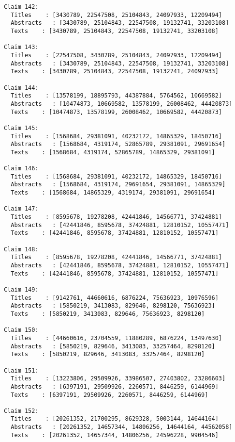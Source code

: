 \documentclass[11pt]{article}
\begin{document}
\begin{Verbatim}[commandchars=\\\{\}]
Claim 142:
  Titles    : [3430789, 22547508, 25104843, 24097933, 12209494]
  Abstracts   : [3430789, 25104843, 22547508, 19132741, 33203108]
  Texts    : [3430789, 25104843, 22547508, 19132741, 33203108]

Claim 143:
  Titles    : [22547508, 3430789, 25104843, 24097933, 12209494]
  Abstracts   : [3430789, 25104843, 22547508, 19132741, 33203108]
  Texts    : [3430789, 25104843, 22547508, 19132741, 24097933]

Claim 144:
  Titles    : [13578199, 18895793, 44387884, 5764562, 10669582]
  Abstracts   : [10474873, 10669582, 13578199, 26008462, 44420873]
  Texts    : [10474873, 13578199, 26008462, 10669582, 44420873]

Claim 145:
  Titles    : [1568684, 29381091, 40232172, 14865329, 18450716]
  Abstracts   : [1568684, 4319174, 52865789, 29381091, 29691654]
  Texts    : [1568684, 4319174, 52865789, 14865329, 29381091]

Claim 146:
  Titles    : [1568684, 29381091, 40232172, 14865329, 18450716]
  Abstracts   : [1568684, 4319174, 29691654, 29381091, 14865329]
  Texts    : [1568684, 14865329, 4319174, 29381091, 29691654]

Claim 147:
  Titles    : [8595678, 19278208, 42441846, 14566771, 37424881]
  Abstracts   : [42441846, 8595678, 37424881, 12810152, 10557471]
  Texts    : [42441846, 8595678, 37424881, 12810152, 10557471]

Claim 148:
  Titles    : [8595678, 19278208, 42441846, 14566771, 37424881]
  Abstracts   : [42441846, 8595678, 37424881, 12810152, 10557471]
  Texts    : [42441846, 8595678, 37424881, 12810152, 10557471]

Claim 149:
  Titles    : [9142761, 44660616, 6876224, 75636923, 10976596]
  Abstracts   : [5850219, 3413083, 829646, 8298120, 75636923]
  Texts    : [5850219, 3413083, 829646, 75636923, 8298120]

Claim 150:
  Titles    : [44660616, 23704559, 11880289, 6876224, 13497630]
  Abstracts   : [5850219, 829646, 3413083, 33257464, 8298120]
  Texts    : [5850219, 829646, 3413083, 33257464, 8298120]

Claim 151:
  Titles    : [13223806, 29509926, 33986507, 27403802, 23286603]
  Abstracts   : [6397191, 29509926, 2260571, 8446259, 6144969]
  Texts    : [6397191, 29509926, 2260571, 8446259, 6144969]

Claim 152:
  Titles    : [20261352, 21700295, 8629328, 5003144, 14644164]
  Abstracts   : [20261352, 14657344, 14806256, 14644164, 44562058]
  Texts    : [20261352, 14657344, 14806256, 24596228, 9904546]


\end{Verbatim}
\end{document}
